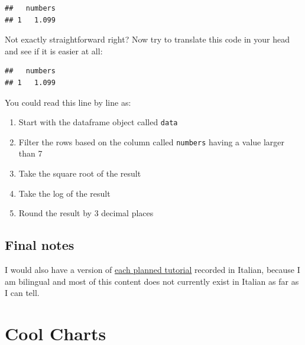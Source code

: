 \documentclass[
]{book}
\newenvironment{Shaded}{\begin{snugshade}}{\end{snugshade}}
\newcommand{\DecValTok}[1]{\textcolor[rgb]{0.00,0.00,0.81}{#1}}
\newcommand{\KeywordTok}[1]{\textcolor[rgb]{0.13,0.29,0.53}{\textbf{#1}}}
\newcommand{\NormalTok}[1]{#1}
\newcommand{\OperatorTok}[1]{\textcolor[rgb]{0.81,0.36,0.00}{\textbf{#1}}}
\newcommand{\StringTok}[1]{\textcolor[rgb]{0.31,0.60,0.02}{#1}}
\begin{document}
\begin{verbatim}
##   numbers
## 1   1.099
\end{verbatim}

Not exactly straightforward right? Now try to translate this code in your head and see if it is easier at all:

\begin{Shaded}
\end{Shaded}

\begin{verbatim}
##   numbers
## 1   1.099
\end{verbatim}

You could read this line by line as:

\begin{enumerate}
\def\labelenumi{\arabic{enumi}.}
\item
  Start with the dataframe object called \texttt{data}
\item
  Filter the rows based on the column called \texttt{numbers} having a value larger than 7
\item
  Take the square root of the result
\item
  Take the log of the result
\item
  Round the result by 3 decimal places
\end{enumerate}

\hypertarget{final-notes}{%
\section{Final notes}\label{final-notes}}

I would also have a version of \protect\hyperlink{tutorials-planned}{each planned tutorial} recorded in Italian, because I am bilingual and most of this content does not currently exist in Italian as far as I can tell.

\hypertarget{cool-charts}{%
\chapter{Cool Charts}\label{cool-charts}}
\end{document}
